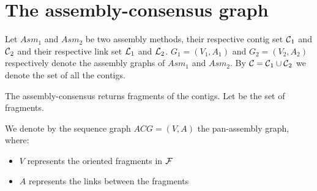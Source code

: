 \section{The assembly-consensus graph}

Let \(Asm_{1}\) and \(Asm_{2}\) be two assembly methods, their respective contig set \(\mathcal{C}{}_{1}\) and \(\mathcal{C}{}_{2}\) and their respective link set \(\mathcal{L}{}_{1}\) and \(\mathcal{L}{}_{2}\).
\(G_{1}= (V_1, A_1)\) and \(G_{2}= (V_2, A_2)\) respectively denote the assembly graphs of \(Asm_{1}\) and \(Asm_{2}\). By \(\mathcal{C}{} = \mathcal{C}{}_1 \cup \mathcal{C}{}_2\) we denote the set of all the contigs.

The assembly-consensus returns fragments of the contigs.
Let \Fragments{} be the set of fragments.

We denote by the sequence graph \(ACG = (V, A)\) the pan-assembly graph, where:
\begin{itemize}
  \item \(V\) represents the oriented fragments in \(\mathcal{F}{}\)
  \item \(A\) represents the links between the fragments
\end{itemize}







